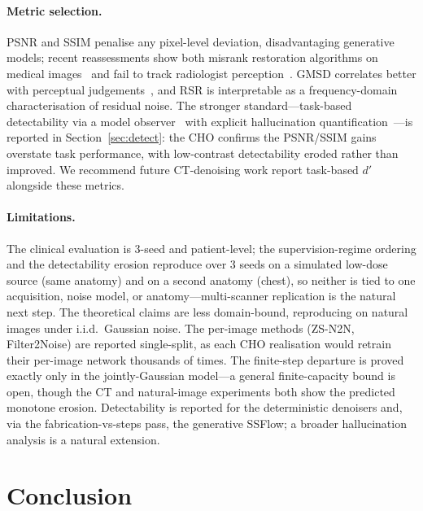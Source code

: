 \documentclass[letterpaper]{article} %
\begin{document}
\paragraph{Metric selection.}
PSNR and SSIM penalise any pixel-level deviation, disadvantaging generative
models; recent reassessments show both misrank restoration algorithms on medical
images~\cite{breger2025reassess} and fail to track radiologist
perception~\cite{lee2025ldctiqa}.  GMSD correlates better with perceptual
judgements~\cite{xue2014gradient}, and RSR is interpretable as a frequency-domain
characterisation of residual noise.  The stronger standard---task-based
detectability via a model observer~\cite{li2021detection,kc2024lgcho} with
explicit hallucination quantification~\cite{bhadra2021halluc,tivnan2024halluc}---is
reported in Section~\ref{sec:detect}: the CHO confirms the PSNR/SSIM gains
overstate task performance, with low-contrast detectability eroded rather than
improved.  We recommend future CT-denoising work report task-based $d'$ alongside
these metrics.

\paragraph{Limitations.}
The clinical evaluation is $3$-seed and patient-level; the
supervision-regime ordering and the detectability erosion reproduce over $3$
seeds on a simulated low-dose source (same anatomy) and on a second
anatomy (chest), so neither is tied to one acquisition, noise model, or
anatomy---multi-scanner replication is the natural next step.  The
theoretical claims are less domain-bound, reproducing on natural images
under i.i.d.\ Gaussian noise.  The per-image methods (ZS-N2N, Filter2Noise) are
reported single-split, as each CHO realisation would retrain their per-image
network thousands of times.  The finite-step departure is proved exactly only in
the jointly-Gaussian model---a general finite-capacity bound is open, though the
CT and natural-image experiments both show the predicted monotone erosion.
Detectability is reported for the deterministic denoisers and, via the
fabrication-vs-steps pass, the generative SSFlow; a broader hallucination analysis
is a natural extension.

\section{Conclusion}
\end{document}
